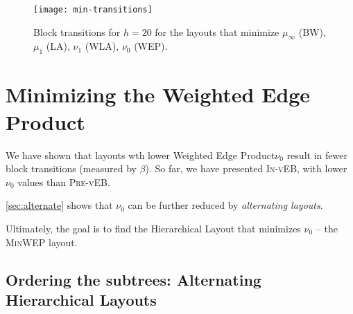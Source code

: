\documentclass[10pt,conference,letterpaper]{IEEEtran}
\newcommand{\todo}[1]{}
\newcommand{\note}[1]{}
\newcommand{\comment}[1]{}
\newcommand{\HL}{Hierarchical Layout\xspace}
\newcommand{\HLs}{Hierarchical Layouts\xspace}
\newcommand{\pvl}{\textsc{Pre-vEB}\xspace}
\newcommand{\ivl}{\textsc{In-vEB}\xspace}
\newcommand{\WEP}{Weighted Edge Product\xspace}
\newcommand{\pmean}[1][p]{\ensuremath{\mu_{#1}}\xspace}
\newcommand{\pwmean}[1][p]{\ensuremath{\nu_{#1}}\xspace}
\newcommand{\PB}{\ensuremath{\beta}\xspace}
\newcommand{\minwep}{\textsc{MinWEP}\xspace}
\begin{document}
\begin{figure}[tp]
\centering \texttt{[image: min-transitions]}\caption{
  Block transitions for $h = 20$ for the layouts
  that minimize
  \pmean[\infty] (\textsc{BW}),
  \pmean[1] (\textsc{LA}),
  \pwmean[1] (\textsc{WLA}),
  \pwmean[0] (\textsc{WEP}).
}\label{fig:min-transitions}\end{figure}

 
\section{Minimizing the Weighted Edge Product}
\label{sec:minwep}

\todo{

Experical claims:
First should be pre-order.
Second may be neighter, for lowest cost. Choose In for all the rest.

Present our grammar, that generalizes vEB layouts.

Experiments: block transitions, WEP cost.
Improvement in MinWEP.
Improvement in Block transitions.

Other interesting properties - Mean Edge distance.

Implementation issues: Implicit/explicit calculations.

Is this optimal? No. Neither in/pre may be the best. But we restrict to them. 
}

We have shown that layouts wth lower \WEP \pwmean[0] result in fewer block transitions (measured by \PB). So far, we have presented \ivl, with lower \pwmean[0] values than \pvl. 
\comment{
In the example presented in \autoref{fig:tree-layouts}, we see that \pwmean[0] for \ivl ($2.227$) is smaller than that of \pvl ($2.824$). 
}
\comment{A natural question to ask is: Is \ivl the best possible layout? }
\autoref{sec:alternate} shows that \pwmean[0] can be further reduced by \emph{alternating layouts}. 
\comment{In the rest of this paper, we introduce new \HLs that result in even lower \WEP.}
Ultimately, the goal is to find the \HL that minimizes \pwmean[0] -- the \minwep layout. 

\subsection{Ordering the subtrees: Alternating \HLs}
\label{sec:alternate}

\note{Should this not go in the section on minimizing \WEP?. Yes, moved there.}
\end{document}
